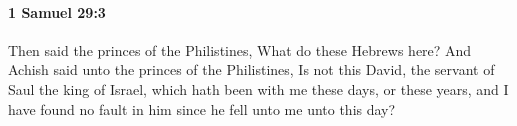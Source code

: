 
		\paragraph{1 Samuel 29:3} %
			\label{1SAMUEL-29-3}

			Then said the princes of the Philistines, What do these Hebrews here? And Achish said unto the princes of the Philistines, Is not this David, the servant of Saul the king of Israel, which hath been with me these days, or these years, and I have found no fault in him since he fell unto me unto this day?


